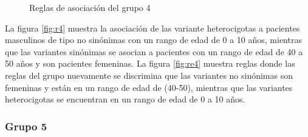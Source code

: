 \begin{figure}[h!]
	\centering
	\caption{Reglas de asociación del grupo 4}\label{fig:reglas4}
\end{figure}

La figura \ref{fig:r4} muestra la asociación de las variante heterocigotas a pacientes masculinos de tipo no sinónimas con un rango de edad de 0 a 10 años, mientras que las variantes sinónimas se asocian a pacientes con un rango de edad de 40 a 50 años y son pacientes femeninas. La figura \ref{fig:re4} muestra reglas  donde las reglas del grupo nuevamente se discrimina que las variantes no sinónimas son femeninas y están en un rango de edad de (40-50), mientras que las variantes heterocigotas se encuentran en un rango de edad de 0 a 10 años. 

\subsubsection*{Grupo 5}

